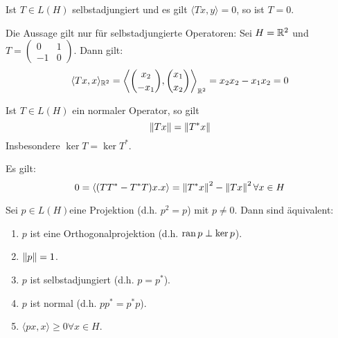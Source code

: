 \newpage
\begin{korollar}
	Ist $ T\in L(H) $ selbstadjungiert und es gilt $ \langle Tx,y\rangle=0 $, so ist $ T=0 $.
\end{korollar}
\begin{bemerkung*}
	Die Aussage gilt nur f\"ur selbstadjungierte Operatoren: Sei $ H=\mathbb{R}^2 $ und $ T=\left(\begin{smallmatrix}
	0&1\\-1&0
	\end{smallmatrix}\right) $. Dann gilt:
	\[ \langle Tx,x\rangle_{\mathbb{R}^2}=\left\langle\binom{x_2}{-x_1},\binom{x_1}{x_2}\right\rangle_{\mathbb{R}^2}=x_2x_2-x_1x_2=0 \]
\end{bemerkung*}
\begin{lemma}
	Ist $ T\in L(H) $ ein normaler Operator, so gilt
	\[ \left\|Tx\right\|=\left\|T^\ast x\right\| \]
	Insbesondere $ \ker T=\ker T^\ast $.
\end{lemma}
\begin{beweis}
	Es gilt:
	\[ 0=\langle (TT^\ast-T^\ast T)x.x\rangle=\left\|T^\ast x\right\|^2-\left\|Tx\right\|^2\forall x\in H \]
\end{beweis}
\begin{satz}
	Sei $ p\in L(H) $eine Projektion (d.h. $ p^2=p $) mit $ p\neq 0 $. Dann sind \"aquivalent:
	\begin{enumerate}
		\item $ p $ ist eine Orthogonalprojektion (d.h. $ \operatorname{ran} p\perp\ker p $).
		\item $ \left\|p\right\|=1 $.
		\item $ p $ ist selbstadjungiert (d.h. $ p=p^\ast $).
		\item $ p $  ist normal (d.h. $ pp^\ast=p^\ast p $).
		\item $ \langle px,x\rangle\geq 0\forall x\in H $.
	\end{enumerate}
\end{satz}
\newpage
